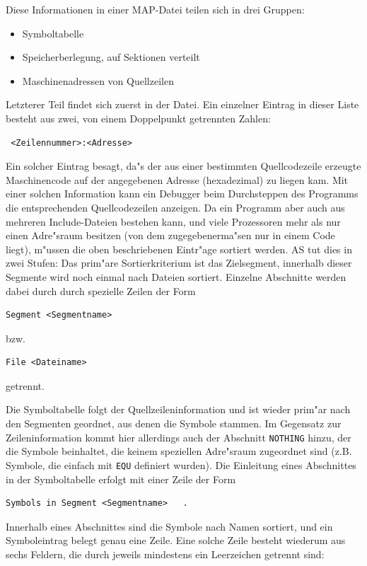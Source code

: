 \documentclass[12pt,a4paper,twoside]{report}
\newcommand{\tty}[1]{{\tt #1}}
\newcommand{\asname}{AS}
\begin{document}
Diese Informationen in einer MAP-Datei teilen sich in drei Gruppen:
\begin{itemize}
\item{Symboltabelle}
\item{Speicherberlegung, auf Sektionen verteilt}
\item{Maschinenadressen von Quellzeilen}
\end{itemize}
Letzterer Teil findet sich zuerst in der Datei.  Ein einzelner
Eintrag in dieser Liste besteht aus zwei, von einem Doppelpunkt
getrennten Zahlen:
\begin{verbatim}
 <Zeilennummer>:<Adresse>
\end{verbatim}
Ein solcher Eintrag besagt, da"s der aus einer bestimmten
Quellcodezeile erzeugte Maschinencode auf der angegebenen Adresse
(hexadezimal) zu liegen kam.  Mit einer solchen Information kann ein
Debugger beim Durchsteppen des Programms die entsprechenden
Quellcodezeilen anzeigen.  Da ein Programm aber auch aus mehreren
Include-Dateien bestehen kann, und viele Prozessoren mehr als nur
einen Adre"sraum besitzen (von dem zugegebenerma"sen nur in einem Code
liegt), m"ussen die oben beschriebenen Eintr"age sortiert werden.  \asname{}
tut dies in zwei Stufen: Das prim"are Sortierkriterium ist das
Zielsegment, innerhalb dieser Segmente wird noch einmal nach Dateien
sortiert.  Einzelne Abschnitte werden dabei durch durch spezielle
Zeilen der Form
\begin{verbatim}
Segment <Segmentname>
\end{verbatim}
bzw.
\begin{verbatim}
File <Dateiname>
\end{verbatim}
getrennt.

Die Symboltabelle folgt der Quellzeileninformation und ist wieder
prim"ar nach den Segmenten geordnet, aus denen die Symbole stammen.
Im Gegensatz zur Zeileninformation kommt hier allerdings auch der
Abschnitt \tty{NOTHING} hinzu, der die Symbole beinhaltet, die keinem
speziellen Adre"sraum zugeordnet sind (z.B. Symbole, die einfach mit
\tty{EQU} definiert wurden).  Die Einleitung eines Abschnittes in der
Symboltabelle erfolgt mit einer Zeile der Form
\begin{verbatim}
Symbols in Segment <Segmentname>   .
\end{verbatim}
Innerhalb eines Abschnittes sind die Symbole nach Namen sortiert, und
ein Symboleintrag belegt genau eine Zeile.  Eine solche Zeile besteht
wiederum aus sechs Feldern, die durch jeweils mindestens ein Leerzeichen
getrennt sind:
\end{document}
